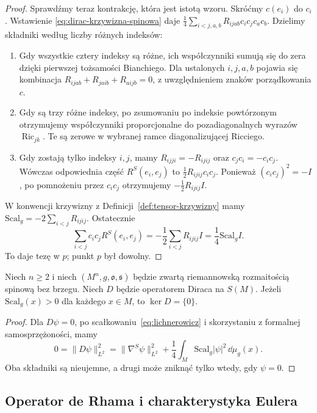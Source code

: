 \begin{proof}
Sprawdźmy teraz kontrakcję, która jest istotą wzoru.
Skróćmy $c(e_i)$ do $c_i$. Wstawienie
\eqref{eq:dirac-krzywizna-spinowa} daje
$\frac14\sum_{i<j,a,b}R_{ijab}c_ic_jc_ac_b$.
Dzielimy składniki według liczby różnych indeksów:
\begin{enumerate}
 \item Gdy wszystkie cztery indeksy są różne,
  ich współczynniki sumują się do zera dzięki
  pierwszej tożsamości Bianchiego. Dla ustalonych
  $i,j,a,b$ pojawia się kombinacja
  $R_{ijab}+R_{jaib}+R_{aijb}=0$,
  z uwzględnieniem znaków porządkowania $c$.
 \item Gdy są trzy różne indeksy, po zsumowaniu
  po indeksie powtórzonym otrzymujemy współczynniki
  proporcjonalne do pozadiagonalnych wyrazów
  $\operatorname{Ric}_{jk}$. Te są zerowe w wybranej
  ramce diagonalizującej Ricciego.
 \item Gdy zostają tylko indeksy $i,j$, mamy
  $R_{ijji}=-R_{ijij}$ oraz $c_jc_i=-c_ic_j$.
  Wówczas odpowiednia część $R^S(e_i,e_j)$ to
  $\tfrac12R_{ijij}c_ic_j$. Ponieważ $(c_ic_j)^2=-I$,
  po pomnożeniu przez $c_ic_j$ otrzymujemy
  $-\tfrac12R_{ijij}I$.
\end{enumerate}
W konwencji krzywizny z
Definicji~\ref{def:tensor-krzywizny} mamy
$\mathrm{Scal}_g=-2\sum_{i<j}R_{ijij}$.
Ostatecznie
\[
 \sum_{i<j}c_ic_jR^S(e_i,e_j)
 =-\frac12\sum_{i<j}R_{ijij}I
 =\frac14\mathrm{Scal}_g I.
\]
To daje tezę w $p$; punkt $p$ był dowolny.
\end{proof}

\begin{wniosek}
\label{cor:dirac-dodatni-scalar}
Niech $n\geq2$ i niech $(M^n,g,\mathfrak o,\mathfrak s)$
będzie zwartą riemannowską rozmaitością spinową bez brzegu.
Niech $D$ będzie operatorem Diraca na $S(M)$.
Jeżeli $\mathrm{Scal}_g(x)>0$ dla każdego $x\in M$,
to $\ker D=\{0\}$.
\end{wniosek}
\begin{proof}
Dla $D\psi=0$, po scałkowaniu~\eqref{eq:lichnerowicz}
i skorzystaniu z formalnej samosprzężoności,
mamy
\[
 0=\|D\psi\|_{L^2}^2
 =\|\nabla^S\psi\|_{L^2}^2
  +\frac14\int_M\mathrm{Scal}_g|\psi|^2\,\dd\mu_g(x).
\]
Oba składniki są nieujemne, a drugi może zniknąć
tylko wtedy, gdy $\psi=0$.
\end{proof}

\subsection{Operator de Rhama i charakterystyka Eulera}

